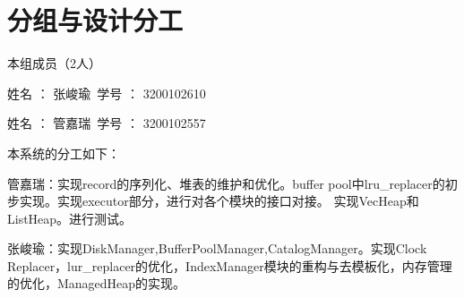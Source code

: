 \documentclass[12pt, a4paper]{article}
\def\s#1{\section{#1}}
\def\p{\par}
\begin{document}
\s{分组与设计分工}
\p 本组成员（2人）
\p 姓名 ： 张峻瑜\ 学号 ： 3200102610
\p 姓名 ： 管嘉瑞\ 学号 ： 3200102557
\\
\p 本系统的分工如下：
\p 管嘉瑞：实现record的序列化、堆表的维护和优化。buffer pool中lru\_replacer的初步实现。实现executor部分，进行对各个模块的接口对接。 实现VecHeap和ListHeap。进行测试。
\p 张峻瑜：实现DiskManager,BufferPoolManager,CatalogManager。实现Clock Replacer，lur\_replacer的优化，IndexManager模块的重构与去模板化，内存管理的优化，ManagedHeap的实现。
\end{document}
